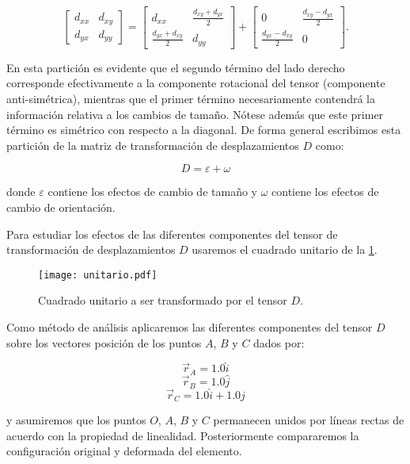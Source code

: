 \documentclass[../notas medios.tex]{subfiles}
\begin{document}
\begin{equation}
\left[ {\begin{array}{*{20}{c}}
{{d_{xx}}}&{{d_{xy}}}\\
{{d_{yx}}}&{{d_{yy}}}
\end{array}} \right] = \left[ {\begin{array}{*{20}{c}}
{{d_{xx}}}&{\frac{{{d_{xy}} + {d_{yx}}}}{2}}\\
{\frac{{{d_{yx}} + {d_{xy}}}}{2}}&{{d_{yy}}}
\end{array}} \right] + \left[ {\begin{array}{*{20}{c}}
0&{\frac{{{d_{xy}} - {d_{yx}}}}{2}}\\
{\frac{{{d_{yx}} - {d_{xy}}}}{2}}&0
\end{array}} \right].
\label{descomp}
\end{equation}

En esta partición es evidente que el segundo término del lado derecho corresponde efectivamente a la componente rotacional del tensor (componente anti-simétrica), mientras que el primer término necesariamente contendrá la información relativa a los cambios de tamaño. Nótese además que este primer término es simétrico con respecto a la diagonal. De forma general escribimos esta partición de la matriz de transformación de desplazamientos $D$ como:


\begin{equation}
D = \varepsilon  + \omega
\label{parti}
\end{equation}

donde $\varepsilon$ contiene los efectos de cambio de tamaño y $\omega$ contiene los efectos de cambio de orientación.

Para estudiar los efectos de las diferentes componentes del tensor de transformación de desplazamientos $D$ usaremos el cuadrado unitario de la \cref{unitario}.

\begin{figure}[H]
\centering
	\texttt{[image: unitario.pdf]}
	\caption{Cuadrado unitario a ser transformado por el tensor $D$.}
	\label{unitario}
\end{figure}

Como método de análisis aplicaremos las diferentes componentes del tensor $D$ sobre los vectores posición de los puntos $A$, $B$ y $C$ dados por:

\[{{\vec r}_A} = 1.0\hat i\]
\[{{\vec r}_B} = 1.0\hat j\]
\[{{\vec r}_C} = 1.0\hat i + 1.0\hat j\]

y asumiremos que los puntos $O$, $A$, $B$ y $C$ permanecen unidos por líneas rectas de acuerdo con la propiedad de linealidad. Posteriormente compararemos la configuración original y deformada del elemento.
\end{document}
